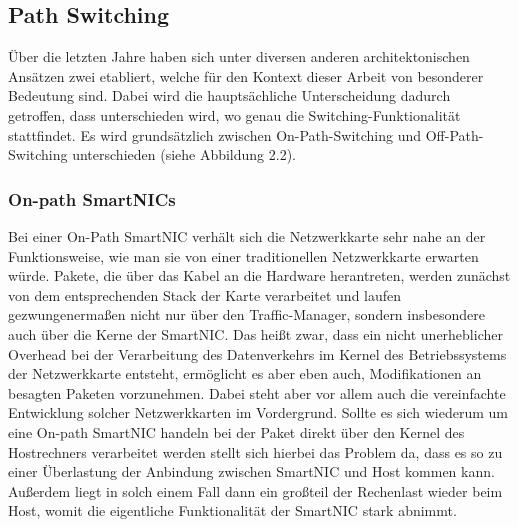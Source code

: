 \subsection{Path Switching}
Über die letzten Jahre haben sich unter diversen anderen architektonischen Ansätzen zwei etabliert, welche für den Kontext dieser Arbeit von besonderer Bedeutung sind. Dabei wird die hauptsächliche Unterscheidung dadurch getroffen, dass unterschieden wird, wo genau die Switching-Funktionalität stattfindet. Es wird grundsätzlich zwischen On-Path-Switching und Off-Path-Switching unterschieden (siehe Abbildung 2.2).
\subsubsection{On-path SmartNICs}
Bei einer On-Path SmartNIC verhält sich die Netzwerkkarte sehr nahe an der Funktionsweise, wie man sie von einer traditionellen Netzwerkkarte erwarten würde. Pakete, die über das Kabel an die Hardware herantreten, werden zunächst von dem entsprechenden Stack der Karte verarbeitet und laufen gezwungenermaßen nicht nur über den Traffic-Manager, sondern insbesondere auch über die Kerne der SmartNIC. \cite{onoffpath} Das heißt zwar, dass ein nicht unerheblicher Overhead bei der Verarbeitung des Datenverkehrs im Kernel des Betriebssystems der Netzwerkkarte entsteht, ermöglicht es aber eben auch, Modifikationen an besagten Paketen vorzunehmen. Dabei steht aber vor allem auch die vereinfachte Entwicklung solcher Netzwerkkarten im Vordergrund. Sollte es sich wiederum um eine On-path SmartNIC handeln bei der Paket direkt über den Kernel des Hostrechners verarbeitet werden stellt sich hierbei das Problem da, dass es so zu einer Überlastung der Anbindung zwischen SmartNIC und Host kommen kann. Außerdem liegt in solch einem Fall dann ein großteil der Rechenlast wieder beim Host, womit die eigentliche Funktionalität der SmartNIC stark abnimmt. 
